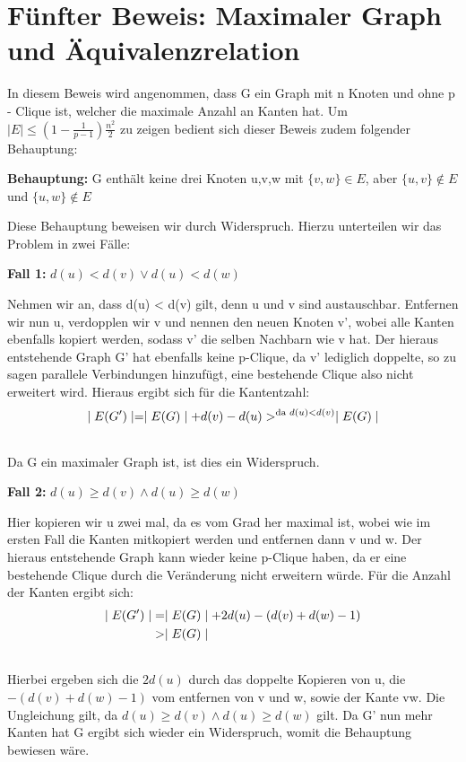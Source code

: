 \documentclass[12pt, a4paper]{article}
\begin{document}
\section{Fünfter Beweis: Maximaler Graph und Äquivalenzrelation}
\label{proof/fifth:funfter-beweis-maximaler-graph-und-aquivalenzrelation}\label{proof/fifth::doc}\label{proof/fifth:index-1}
In diesem Beweis wird angenommen, dass G ein Graph mit n Knoten und ohne p - Clique ist, welcher die maximale Anzahl an Kanten hat.
Um $\mid E \mid \le (1- \frac{1}{p-1}) \frac{n^2}{2}$ zu zeigen bedient sich dieser Beweis zudem folgender Behauptung:

\textbf{Behauptung:} G enthält keine drei Knoten u,v,w mit $\{ v, w \} \in E$, aber $\{ u, v \} \notin E$ und $\{ u, w \} \notin E$

Diese Behauptung beweisen wir durch Widerspruch. Hierzu unterteilen wir das Problem in zwei Fälle:

\textbf{Fall 1:} $d(u) < d(v) \vee d(u) < d(w)$

Nehmen wir an, dass d(u) \textless{} d(v) gilt, denn u und v sind austauschbar.
Entfernen wir nun u, verdopplen wir v und nennen den neuen Knoten v', wobei alle Kanten ebenfalls kopiert werden, sodass v' die selben Nachbarn wie v hat. Der hieraus entstehende Graph G' hat ebenfalls keine p-Clique, da v' lediglich doppelte, so zu sagen parallele Verbindungen hinzufügt, eine bestehende Clique also nicht erweitert wird. Hieraus ergibt sich für die Kantentzahl:
\begin{gather}
\begin{split}\mid E(G') \mid = \mid E(G) \mid + d(v) - d(u) >^{\text{da } d(u) < d(v)} \mid E(G) \mid\end{split}\notag\\\begin{split}\end{split}\notag
\end{gather}
Da G ein maximaler Graph ist, ist dies ein Widerspruch.

\textbf{Fall 2:} $d(u) \ge d(v) \wedge d(u) \ge d(w)$

Hier kopieren wir u zwei mal, da es vom Grad her maximal ist, wobei wie im ersten Fall die Kanten mitkopiert werden und entfernen dann v und w. Der hieraus entstehende Graph kann wieder keine p-Clique haben, da er eine bestehende Clique durch die Veränderung nicht erweitern würde. Für die Anzahl der Kanten ergibt sich:
\begin{gather}
\begin{split}\mid E(G') \mid &= \mid E(G) \mid + 2 d(u) - (d(v) + d(w) - 1) \\
&> \mid E(G) \mid\end{split}\notag\\\begin{split}\end{split}\notag
\end{gather}
Hierbei ergeben sich die $2d(u)$ durch das doppelte Kopieren von u, die $- (d(v) + d(w) - 1)$ vom entfernen von v und w, sowie der Kante vw. Die Ungleichung gilt, da $d(u) \ge d(v) \wedge d(u) \ge d(w)$ gilt. Da G' nun mehr Kanten hat G ergibt sich wieder ein Widerspruch, womit die Behauptung bewiesen wäre.
\end{document}
